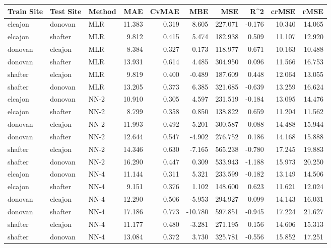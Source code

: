 \begin{table}[h]
\begin{tabular}{lllrrrrrrr}
\toprule
 Train Site & Test Site & Method &   MAE &  CvMAE &       MBE &     MSE &   R\textasciicircum2 &  crMSE &   rMSE \\
\midrule
elcajon & donovan & MLR & 11.383 & 0.319 & 8.605 & 227.071 & -0.176 & 10.340 & 14.065\\
elcajon & shafter & MLR & 9.812 & 0.415 & 5.474 & 182.938 & 0.509 & 11.107 & 12.920\\
donovan & elcajon & MLR & 8.384 & 0.327 & 0.173 & 118.977 & 0.671 & 10.163 & 10.488\\
donovan & shafter & MLR & 13.931 & 0.614 & 4.485 & 304.950 & 0.096 & 11.566 & 16.753\\
shafter & elcajon & MLR & 9.819 & 0.400 & -0.489 & 187.609 & 0.448 & 12.064 & 13.055\\
shafter & donovan & MLR & 13.205 & 0.373 & 6.385 & 321.685 & -0.639 & 13.259 & 16.624\\
elcajon & donovan & NN-2 & 10.910 & 0.305 & 4.597 & 231.519 & -0.184 & 13.095 & 14.476\\
elcajon & shafter & NN-2 & 8.799 & 0.358 & 0.850 & 138.822 & 0.659 & 11.204 & 11.562\\
donovan & elcajon & NN-2 & 11.993 & 0.492 & -5.201 & 300.587 & 0.088 & 14.488 & 15.944\\
donovan & shafter & NN-2 & 12.644 & 0.547 & -4.902 & 276.752 & 0.186 & 14.168 & 15.888\\
shafter & elcajon & NN-2 & 14.346 & 0.630 & -7.165 & 565.238 & -0.780 & 17.245 & 19.883\\
shafter & donovan & NN-2 & 16.290 & 0.447 & 0.309 & 533.943 & -1.188 & 15.973 & 20.250\\
elcajon & donovan & NN-4 & 11.144 & 0.311 & 5.321 & 233.599 & -0.182 & 13.149 & 14.506\\
elcajon & shafter & NN-4 & 9.151 & 0.376 & 1.102 & 148.600 & 0.623 & 11.621 & 12.024\\
donovan & elcajon & NN-4 & 12.290 & 0.506 & -5.953 & 294.927 & 0.099 & 14.143 & 16.031\\
donovan & shafter & NN-4 & 17.186 & 0.773 & -10.780 & 597.851 & -0.945 & 17.224 & 21.627\\
shafter & elcajon & NN-4 & 11.177 & 0.480 & -3.281 & 271.195 & 0.156 & 14.606 & 15.313\\
shafter & donovan & NN-4 & 13.084 & 0.372 & 3.730 & 325.781 & -0.556 & 15.852 & 17.251\\

\end{tabular}
\end{table}
